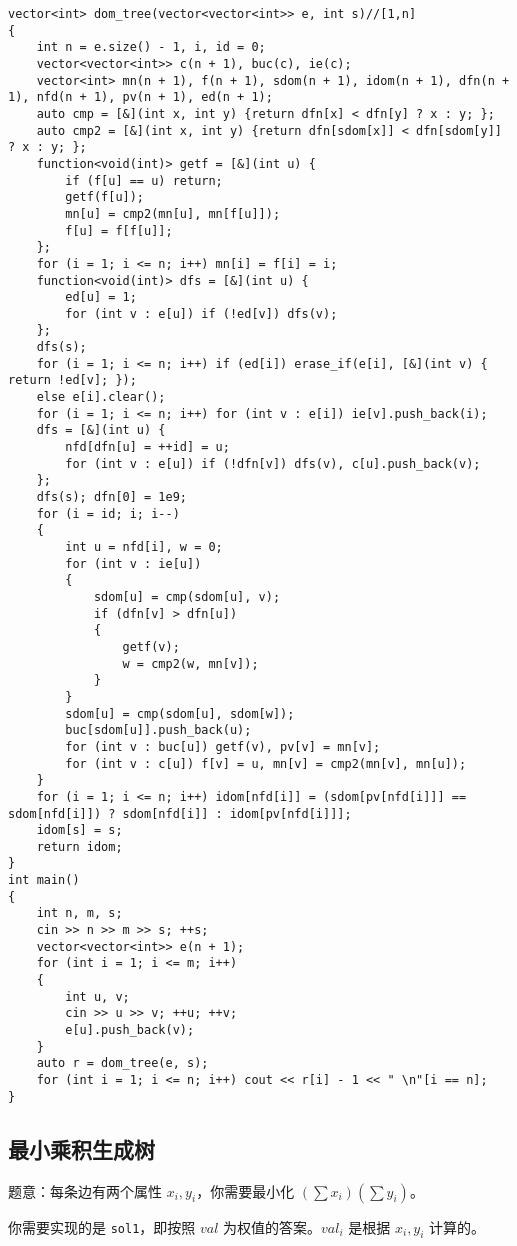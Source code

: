\documentclass[12pt]{ctexart}
\begin{document}
\begin{lstlisting}
vector<int> dom_tree(vector<vector<int>> e, int s)//[1,n]
{
	int n = e.size() - 1, i, id = 0;
	vector<vector<int>> c(n + 1), buc(c), ie(c);
	vector<int> mn(n + 1), f(n + 1), sdom(n + 1), idom(n + 1), dfn(n + 1), nfd(n + 1), pv(n + 1), ed(n + 1);
	auto cmp = [&](int x, int y) {return dfn[x] < dfn[y] ? x : y; };
	auto cmp2 = [&](int x, int y) {return dfn[sdom[x]] < dfn[sdom[y]] ? x : y; };
	function<void(int)> getf = [&](int u) {
		if (f[u] == u) return;
		getf(f[u]);
		mn[u] = cmp2(mn[u], mn[f[u]]);
		f[u] = f[f[u]];
	};
	for (i = 1; i <= n; i++) mn[i] = f[i] = i;
	function<void(int)> dfs = [&](int u) {
		ed[u] = 1;
		for (int v : e[u]) if (!ed[v]) dfs(v);
	};
	dfs(s);
	for (i = 1; i <= n; i++) if (ed[i]) erase_if(e[i], [&](int v) { return !ed[v]; });
	else e[i].clear();
	for (i = 1; i <= n; i++) for (int v : e[i]) ie[v].push_back(i);
	dfs = [&](int u) {
		nfd[dfn[u] = ++id] = u;
		for (int v : e[u]) if (!dfn[v]) dfs(v), c[u].push_back(v);
	};
	dfs(s); dfn[0] = 1e9;
	for (i = id; i; i--)
	{
		int u = nfd[i], w = 0;
		for (int v : ie[u])
		{
			sdom[u] = cmp(sdom[u], v);
			if (dfn[v] > dfn[u])
			{
				getf(v);
				w = cmp2(w, mn[v]);
			}
		}
		sdom[u] = cmp(sdom[u], sdom[w]);
		buc[sdom[u]].push_back(u);
		for (int v : buc[u]) getf(v), pv[v] = mn[v];
		for (int v : c[u]) f[v] = u, mn[v] = cmp2(mn[v], mn[u]);
	}
	for (i = 1; i <= n; i++) idom[nfd[i]] = (sdom[pv[nfd[i]]] == sdom[nfd[i]]) ? sdom[nfd[i]] : idom[pv[nfd[i]]];
	idom[s] = s;
	return idom;
}
int main()
{
	int n, m, s;
	cin >> n >> m >> s; ++s;
	vector<vector<int>> e(n + 1);
	for (int i = 1; i <= m; i++)
	{
		int u, v;
		cin >> u >> v; ++u; ++v;
		e[u].push_back(v);
	}
	auto r = dom_tree(e, s);
	for (int i = 1; i <= n; i++) cout << r[i] - 1 << " \n"[i == n];
}

\end{lstlisting}

\subsection{最小乘积生成树}

题意：每条边有两个属性 $x_i,y_i$，你需要最小化 $(\sum x_i)(\sum y_i)$。

你需要实现的是 \verb|sol1|，即按照 $val$ 为权值的答案。$val_i$ 是根据 $x_i,y_i$ 计算的。
\end{document}
